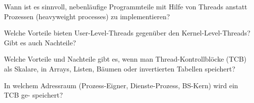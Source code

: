 

\begin{description}

Wann ist es sinnvoll, nebenläufige Programmteile mit Hilfe von Threads anstatt Prozessen
(heavyweight processes) zu implementieren?

Welche Vorteile bieten User-Level-Threads gegenüber den Kernel-Level-Threads? Gibt es
auch Nachteile?

Welche Vorteile und Nachteile gibt es, wenn man Thread-Kontrollblöcke (TCB) als Skalare, in
Arrays, Listen, Bäumen oder invertierten Tabellen speichert?

In welchem Adressraum (Prozess-Eigner, Dienste-Prozess, BS-Kern) wird ein TCB ge-
speichert?


\end{description}
